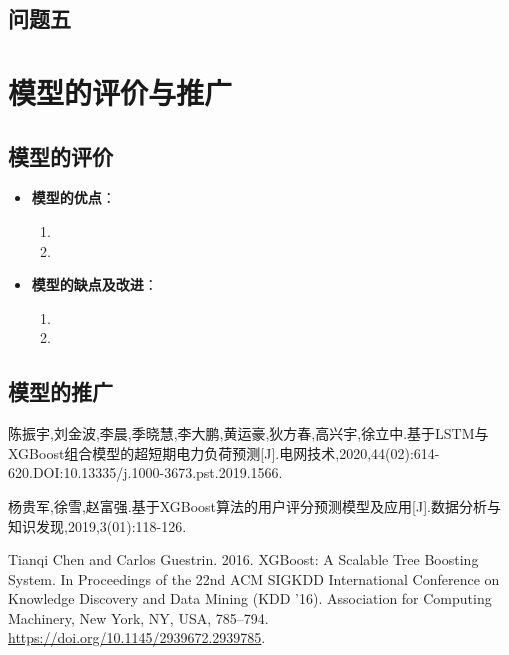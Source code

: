 \documentclass{MathModeling}
\begin{document}
	\subsection{问题五}

\section{模型的评价与推广}
	\subsection{模型的评价}
	\begin{itemize}
		\item \textbf{模型的优点}：
			\begin{enumerate}
				\item 
				\item 
			\end{enumerate}
		\item \textbf{模型的缺点及改进}：
			\begin{enumerate}
				\item 
				\item 
			\end{enumerate}
	\end{itemize}
	\subsection{模型的推广}
	
	\newpage
	\begin{spacing}{1.08}
	\begin{thebibliography}{99}
	陈振宇,刘金波,李晨,季晓慧,李大鹏,黄运豪,狄方春,高兴宇,徐立中.基于LSTM与XGBoost组合模型的超短期电力负荷预测[J].电网技术,2020,44(02):614-620.DOI:10.13335/j.1000-3673.pst.2019.1566.

	杨贵军,徐雪,赵富强.基于XGBoost算法的用户评分预测模型及应用[J].数据分析与知识发现,2019,3(01):118-126.

	Tianqi Chen and Carlos Guestrin. 2016. XGBoost: A Scalable Tree Boosting System. In Proceedings of the 22nd ACM SIGKDD International Conference on Knowledge Discovery and Data Mining (KDD '16). Association for Computing Machinery, New York, NY, USA, 785–794. \url{https://doi.org/10.1145/2939672.2939785}.

	\end{thebibliography}
	\end{spacing}
	\newpage
\end{document}
